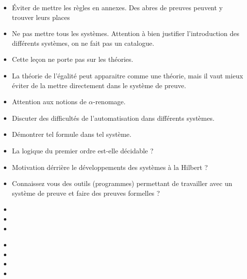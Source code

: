 \documentclass{agregfiche}
\begin{document}
\secpieges

\begin{itemize}
	\item Éviter de mettre les règles en annexes. Des abres de preuves peuvent y trouver leurs places
	\item Ne pas mettre tous les systèmes. Attention à bien justifier l'introduction des différents systèmes, on ne fait pas un catalogue.
	\item Cette leçon ne porte pas sur les théories.
    \item La théorie de l'égalité peut apparaitre comme une théorie, mais il vaut mieux éviter de la mettre directement dans le système de preuve.
    \item Attention aux notions de $\alpha$-renomage.
\end{itemize}

\secquestionsclassiques

\begin{itemize}
	\item Discuter des difficultés de l'automatisation dans différents systèmes.
	\item Démontrer tel formule dans tel système.
	\item La logique du premier ordre est-elle décidable ?
	\item Motivation dérrière le développements des systèmes à la Hilbert ?
	\item Connaissez vous des outils (programmes) permettant de travailler avec un système de preuve et faire des preuves formelles ?
\end{itemize}

\secreferences

\begin{itemize}
\item 
\item {}
\item {}
\end{itemize}

\secdev

\begin{itemize}
\item {}
\item {}
\item {}
\item {}
\end{itemize}
\end{document}
